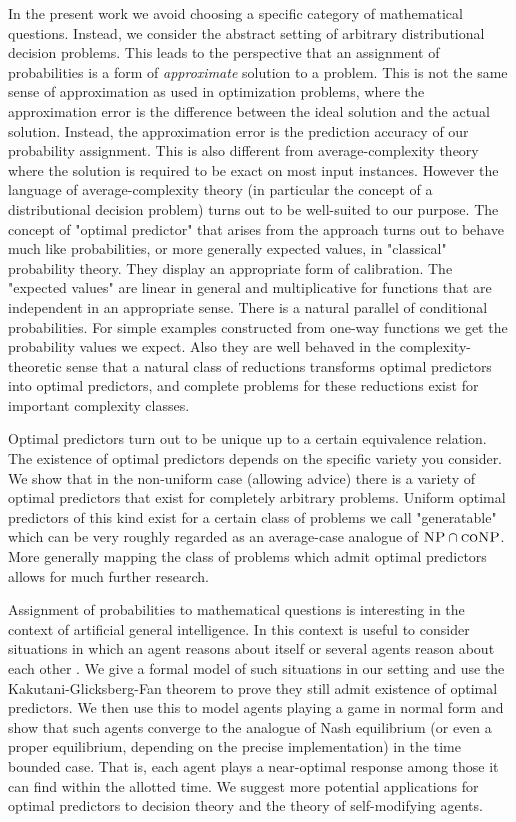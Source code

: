 \documentclass{article}
\numberwithin{equation}{section}
\theoremstyle{definition}
\theoremstyle{plain}
\begin{document}
In the present work we avoid choosing a specific category of mathematical questions. Instead, we consider the abstract setting of arbitrary distributional decision problems. This leads to the perspective that an assignment of probabilities is a form of \emph{approximate} solution to a problem. This is not the same sense of approximation as used in optimization problems, where the approximation error is the difference between the ideal solution and the actual solution. Instead, the approximation error is the prediction accuracy of our probability assignment. This is also different from average-complexity theory where the solution is required to be exact on most input instances. However the language of average-complexity theory (in particular the concept of a distributional decision problem) turns out to be well-suited to our purpose.
The concept of "optimal predictor" that arises from the approach turns out to behave much like probabilities, or more generally expected values, in "classical" probability theory. They display an appropriate form of calibration. The "expected values" are linear in general and multiplicative for functions that are independent in an appropriate sense. There is a natural parallel of conditional probabilities. For simple examples constructed from one-way functions we get the probability values we expect. Also they are well behaved in the complexity-theoretic sense that a natural class of reductions transforms optimal predictors into optimal predictors, and complete problems for these reductions exist for important complexity classes.

Optimal predictors turn out to be unique up to a certain equivalence relation. The existence of optimal predictors depends on the specific variety you consider. We show that in the non-uniform case (allowing advice) there is a variety of optimal predictors that exist for completely arbitrary problems. Uniform optimal predictors of this kind exist for a certain class of problems we call "generatable" which can be very roughly regarded as an average-case analogue of $\textsc{NP} \cap \textsc{coNP}$. More generally mapping the class of problems which admit optimal predictors allows for much further research.

Assignment of probabilities to mathematical questions is interesting in the context of artificial general intelligence\cite{Hutter_2013,Christiano_2014}. In this context is useful to consider situations in which an agent reasons about itself or several agents reason about each other \cite{Fallenstein_2015}. We give a formal model of such situations in our setting and use the Kakutani-Glicksberg-Fan theorem to prove they still admit existence of optimal predictors. We then use this to model agents playing a game in normal form and show that such agents converge to the analogue of Nash equilibrium (or even a proper equilibrium, depending on the precise implementation) in the time bounded case. That is, each agent plays a near-optimal response among those it can find within the allotted time. We suggest more potential applications for optimal predictors to decision theory and the theory of self-modifying agents.
\end{document}
